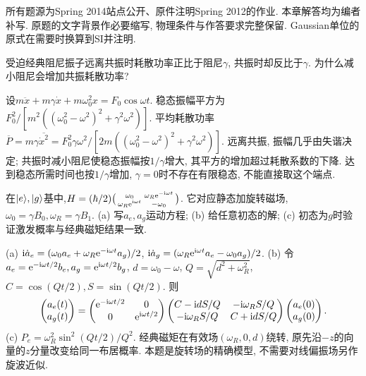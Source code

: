所有题源为Spring 2014站点公开、原件注明Spring 2012的作业. 本章解答均为编者补写. 原题的文字背景作必要缩写, 物理条件与作答要求完整保留. Gaussian单位的原式在需要时换算到SI并注明.
\begin{exercise}受迫经典阻尼振子远离共振时耗散功率正比于阻尼$\gamma$, 共振时却反比于$\gamma$. 为什么减小阻尼会增加共振耗散功率?\end{exercise}
\begin{solution}设$m\ddot x+m\gamma\dot x+m\omega_0^2x=F_0\cos\omega t$. 稳态振幅平方为$F_0^2/[m^2((\omega_0^2-\omega^2)^2+\gamma^2\omega^2)]$. 平均耗散功率$\overline P=m\gamma\overline{\dot x^2}=F_0^2\gamma\omega^2/[2m((\omega_0^2-\omega^2)^2+\gamma^2\omega^2)]$. 远离共振, 振幅几乎由失谐决定; 共振时减小阻尼使稳态振幅按$1/\gamma$增大, 其平方的增加超过耗散系数的下降. 达到稳态所需时间也按$1/\gamma$增加, $\gamma=0$时不存在有限稳态, 不能直接取这个端点.
\end{solution}
\begin{exercise}在$\lvert e\rangle,\lvert g\rangle$基中,$H=(\hbar/2)\bigl(\begin{smallmatrix}\omega_0&\omega_R\mathrm e^{-\mathrm i\omega t}\\\omega_R\mathrm e^{\mathrm i\omega t}&-\omega_0\end{smallmatrix}\bigr)$. 它对应静态加旋转磁场,$\omega_0=\gamma B_0,\omega_R=\gamma B_1$. (a) 写$a_e,a_g$运动方程; (b) 给任意初态的解; (c) 初态为$g$时验证激发概率与经典磁矩结果一致.\end{exercise}
\begin{solution}(a) $\mathrm i\dot a_e=(\omega_0a_e+\omega_R\mathrm e^{-\mathrm i\omega t}a_g)/2$, $\mathrm i\dot a_g=(\omega_R\mathrm e^{\mathrm i\omega t}a_e-\omega_0a_g)/2$. (b) 令$a_e=\mathrm e^{-\mathrm i\omega t/2}b_e,a_g=\mathrm e^{\mathrm i\omega t/2}b_g$, $d=\omega_0-\omega$, $Q=\sqrt{d^2+\omega_R^2}$,$C=\cos(Qt/2),S=\sin(Qt/2)$. 则
\[\begin{pmatrix}a_e(t)\\a_g(t)\end{pmatrix}=\begin{pmatrix}\mathrm e^{-\mathrm i\omega t/2}&0\\0&\mathrm e^{\mathrm i\omega t/2}\end{pmatrix}\begin{pmatrix}C-\mathrm i dS/Q&-\mathrm i\omega_RS/Q\\-\mathrm i\omega_RS/Q&C+\mathrm i dS/Q\end{pmatrix}\begin{pmatrix}a_e(0)\\a_g(0)\end{pmatrix}.\]
(c) $P_e=\omega_R^2\sin^2(Qt/2)/Q^2$. 经典磁矩在有效场$(\omega_R,0,d)$绕转, 原先沿$-z$的向量的$z$分量改变给同一布居概率. 本题是旋转场的精确模型, 不需要对线偏振场另作旋波近似.
\end{solution}
